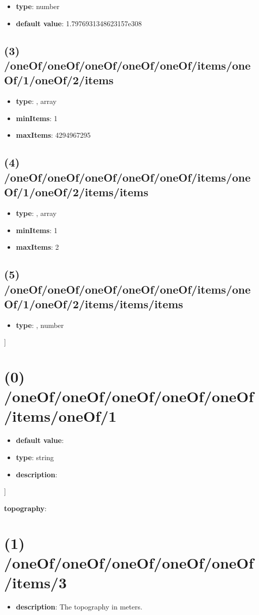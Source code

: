 \begin{itemize}[leftmargin=4em]\item {\bf type}: number\item {\bf default value}: 1.7976931348623157e308
\end{itemize}\subsection{(3) /oneOf/oneOf/oneOf/oneOf/oneOf/items/oneOf/1/oneOf/2/items}
\begin{itemize}[leftmargin=3em]\item {\bf type}: , array\item {\bf minItems}: 1
\item {\bf maxItems}: 4294967295
\end{itemize}\subsection{(4) /oneOf/oneOf/oneOf/oneOf/oneOf/items/oneOf/1/oneOf/2/items/items}
\begin{itemize}[leftmargin=4em]\item {\bf type}: , array\item {\bf minItems}: 1
\item {\bf maxItems}: 2
\end{itemize}\subsection{(5) /oneOf/oneOf/oneOf/oneOf/oneOf/items/oneOf/1/oneOf/2/items/items/items}
\begin{itemize}[leftmargin=5em]\item {\bf type}: , number\end{itemize}]\section{(0) /oneOf/oneOf/oneOf/oneOf/oneOf/items/oneOf/1}
\begin{itemize}[leftmargin=0em]\item {\bf default value}: 
\item {\bf type}: string
\item {\bf description}: 
\end{itemize}]\item {\bf topography}: \section{(1) /oneOf/oneOf/oneOf/oneOf/oneOf/items/3}
\begin{itemize}[leftmargin=1em]\item {\bf description}: The topography in meters.
\end{itemize}
